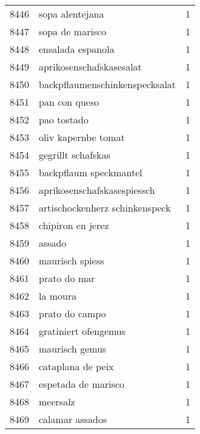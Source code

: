 \begin{tabular}{llr}
8446 &                                    sopa alentejana &      1 \\
8447 &                                    sopa de marisco &      1 \\
8448 &                                  ensalada espanola &      1 \\
8449 &                           aprikosenschafskasesalat &      1 \\
8450 &                     backpflaumenschinkenspecksalat &      1 \\
8451 &                                      pan con queso &      1 \\
8452 &                                        pao tostado &      1 \\
8453 &                                oliv kapernbe tomat &      1 \\
8454 &                                 gegrillt schafskas &      1 \\
8455 &                             backpflaum speckmantel &      1 \\
8456 &                        aprikosenschafskasespiessch &      1 \\
8457 &                     artischockenherz schinkenspeck &      1 \\
8458 &                                  chipiron en jerez &      1 \\
8459 &                                             assado &      1 \\
8460 &                                    maurisch spiess &      1 \\
8461 &                                       prato do mar &      1 \\
8462 &                                           la moura &      1 \\
8463 &                                     prato do campo &      1 \\
8464 &                               gratiniert ofengemus &      1 \\
8465 &                                     maurisch gemus &      1 \\
8466 &                                  cataplana de peix &      1 \\
8467 &                                espetada de marisco &      1 \\
8468 &                                           meersalz &      1 \\
8469 &                                    calamar assados &      1 \\

\end{tabular}
